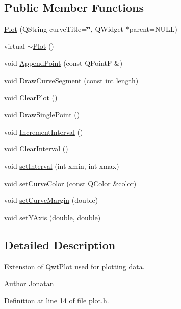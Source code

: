 \subsection*{Public Member Functions}
\begin{DoxyCompactItemize}
\item 
\hyperlink{classPlot_a26093e28c6d18a6324f421278474538d}{Plot} (Q\+String curve\+Title=\char`\"{}\char`\"{}, Q\+Widget $\ast$parent=N\+U\+LL)
\item 
virtual \hyperlink{classPlot_a277e9c79c4357b3a317d74d61dabefcf}{$\sim$\+Plot} ()
\item 
void \hyperlink{classPlot_a983cc18b014a7da6a9ebd18d941a2810}{Append\+Point} (const Q\+PointF \&)
\item 
void \hyperlink{classPlot_a19036300cad7a088f1453ff17162490f}{Draw\+Curve\+Segment} (const int length)
\item 
void \hyperlink{classPlot_af2b50b6923556e2bb04fd0b0dc7da318}{Clear\+Plot} ()
\item 
void \hyperlink{classPlot_acb0268b78902a0105c27e456e272e9b0}{Draw\+Single\+Point} ()
\item 
void \hyperlink{classPlot_a3deed9a4018d838d2c21d37e7b550fe0}{Increment\+Interval} ()
\item 
void \hyperlink{classPlot_a02379d1d3094929aff97df8aa5c83fd6}{Clear\+Interval} ()
\item 
void \hyperlink{classPlot_a932e846d63f6e6192485fa8402c1c7bf}{set\+Interval} (int xmin, int xmax)
\item 
void \hyperlink{classPlot_af2d2fb49ecae0a12196606a153f5bee0}{set\+Curve\+Color} (const Q\+Color \&color)
\item 
void \hyperlink{classPlot_a06a7d71c936d5e303fddbed3aac9b99f}{set\+Curve\+Margin} (double)
\item 
void \hyperlink{classPlot_a783f800388cb6615b60efbafa523fbf0}{set\+Y\+Axis} (double, double)
\end{DoxyCompactItemize}


\subsection{Detailed Description}
Extension of Qwt\+Plot used for plotting data. 

\begin{DoxyAuthor}{Author}
Jonatan 
\end{DoxyAuthor}


Definition at line \hyperlink{plot_8h_source_l00014}{14} of file \hyperlink{plot_8h_source}{plot.\+h}.




